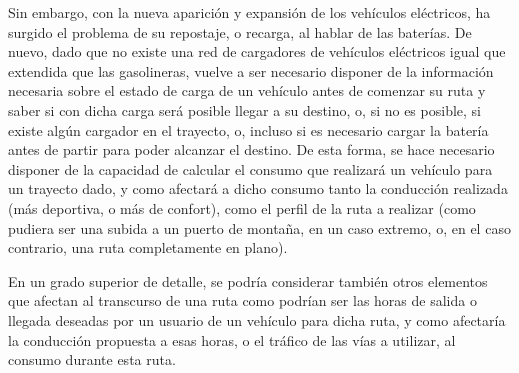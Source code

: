\documentclass[11pt,spanish,listoffigures,listoftables]{tfgetsinf}
\begin{document}
Sin embargo, con la nueva aparición y expansión de los vehículos eléctricos, ha surgido el problema de su repostaje, o recarga, al hablar de las baterías. De nuevo, dado que no existe una red de cargadores de vehículos eléctricos igual que extendida que las gasolineras, vuelve a ser necesario disponer de la información necesaria sobre el estado de carga de un vehículo antes de comenzar su ruta y saber si con dicha carga será posible llegar a su destino, o, si no es posible, si existe algún cargador en el trayecto, o, incluso si es necesario cargar la batería antes de partir para poder alcanzar el destino. De esta forma, se hace necesario disponer de la capacidad de calcular el consumo que realizará un vehículo para un trayecto dado, y como afectará a dicho consumo tanto la conducción realizada (más deportiva, o más de confort), como el perfil de la ruta a realizar (como pudiera ser una subida a un puerto de montaña, en un caso extremo, o, en el caso contrario, una ruta completamente en plano).

En un grado superior de detalle, se podría considerar también otros elementos que afectan al transcurso de una ruta como podrían ser las horas de salida o llegada deseadas por un usuario de un vehículo para dicha ruta, y como afectaría la conducción propuesta a esas horas, o el tráfico de las vías a utilizar, al consumo durante esta ruta.

\end{document}
